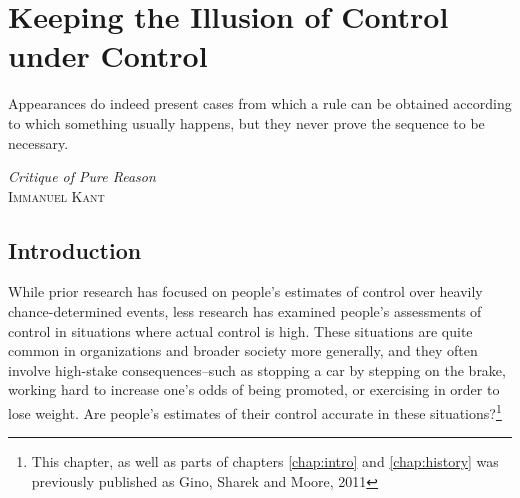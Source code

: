 \documentclass[USenglish,letterpaper,12pt,extrafontsizes,oneside,onecolumn,final]{memoir}
\newcommand{\deltap}{$\Delta P$}
\begin{document}
%
%  


\chapter{Keeping the Illusion of Control under Control}
\label{chap:ioc}

\epigraph{\SingleSpacing Appearances do indeed present cases from which a rule can be obtained according to which something usually happens, but they never prove the sequence to be necessary.}{\textit{Critique of Pure Reason}\\ \textsc{Immanuel Kant}}

\section{Introduction}
While prior research has focused on people's estimates of control over heavily chance-determined events, less research has examined people's assessments of control in situations where actual control is high. These situations are quite common in organizations and broader society more generally, and they often involve high-stake consequences--such as stopping a car by stepping on the brake, working hard to increase one's odds of being promoted, or exercising in order to lose weight. Are people's estimates of their control accurate in these situations?\footnote{This chapter, as well as parts of chapters \ref{chap:intro} and \ref{chap:history} was previously published as Gino, Sharek and Moore, 2011}  
\end{document}
